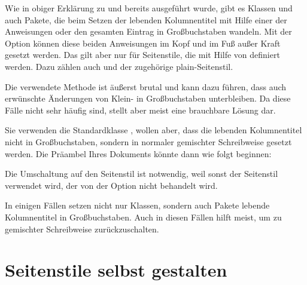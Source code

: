 \begin{Declaration}
\end{Declaration}%
Wie in obiger Erklärung zu  und 
bereits ausgeführt wurde, gibt es Klassen und auch Pakete, die beim Setzen der
lebenden Kolumnentitel mit Hilfe einer der
Anweisungen 
oder
den gesamten Eintrag in Großbuchstaben wandeln. Mit der Option
 können diese beiden Anweisungen im Kopf und im Fuß außer
Kraft gesetzt werden. Das gilt aber nur für Seitenstile, die mit Hilfe von
 definiert werden. Dazu zählen auch 
und der zugehörige plain-Seitenstil.

Die verwendete Methode ist äußerst brutal und kann dazu führen, dass
auch erwünschte Änderungen von Klein- in
Großbuchstaben unterbleiben. Da
diese Fälle nicht sehr häufig sind, stellt  aber
meist eine brauchbare Lösung dar.
\begin{Example}
  Sie verwenden die Standardklasse ,
  wollen aber, dass die lebenden Kolumnentitel nicht in
  Großbuchstaben, sondern in normaler gemischter Schreibweise gesetzt
  werden. Die Präambel Ihres Dokuments könnte dann wie folgt beginnen:
  Die Umschaltung auf den Seitenstil  ist
  notwendig, weil sonst der Seitenstil  verwendet
  wird, der von der Option  nicht behandelt wird.
\end{Example}

In einigen Fällen setzen nicht nur Klassen, sondern auch Pakete
lebende Kolumnentitel in Großbuchstaben. Auch in diesen Fällen hilft
 meist, um zu gemischter Schreibweise
zurückzuschalten.%
%
\EndIndexGroup


\section{Seitenstile selbst gestalten}\label{sec:scrpage-de.UI}
%
% 
